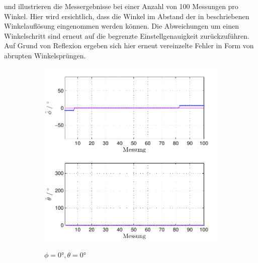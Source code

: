  und  illustrieren die Messergebnisse bei einer Anzahl von 100 Messungen pro Winkel. Hier wird ersichtlich, dass die Winkel im Abstand der in   beschriebenen Winkelauflösung eingenommen werden können. Die Abweichungen um einen Winkelschritt sind erneut auf die begrenzte Einstellgenauigkeit zurückzuführen. Auf Grund von Reflexion ergeben sich hier erneut vereinzelte Fehler in Form von abrupten Winkelsprüngen.


\begin{figure}
        \centering
        \begin{subfigure}[b]{0.48\textwidth}
                \centering
                \includegraphics[width=\textwidth]{images/04_Echtzeitversuch/MALE_Phi_0_Theta_0}
                \label{fig:Foto_DSP_Draufsicht_Seitanansicht}
                \caption{$\phi=0°, \theta = 0°$}
        \end{subfigure}
        ~ %
        \begin{subfigure}[b]{0.48\textwidth}
                \centering

\end{subfigure}
\end{figure}
